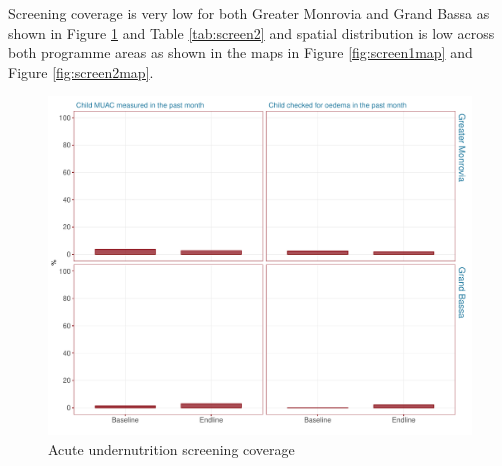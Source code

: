 \documentclass[12pt,a4paper]{article}
\begin{document}
Screening coverage is very low for both Greater Monrovia and Grand Bassa as shown in Figure \ref{fig:screen1} and Table \ref{tab:screen2} and spatial distribution is low across both programme areas as shown in the maps in Figure \ref{fig:screen1map} and Figure \ref{fig:screen2map}.

\begin{figure}[H]

{\centering \includegraphics{liberiaCoverageFinalReport_files/figure-latex/screen1-1} 

}

\caption{Acute undernutrition screening coverage}\label{fig:screen1}
\end{figure}
\end{document}
